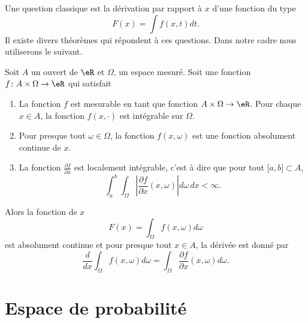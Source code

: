 Une question classique est la dérivation par rapport à \( x\) d'une fonction du type
\begin{equation}
    F(x)=\int f(x,t)dt.
\end{equation}
Il existe divers théorèmes qui répondent à ces questions. Dans notre cadre nous utiliserons le suivant.
\begin{theorem}     \label{ThoDerSousIntegrale}
    Soit \( A\) un ouvert de \( \eR\) et \( \Omega\), un espace mesuré. Soit une fonction \( f\colon A\times \Omega\to \eR\) qui satisfait
    \begin{enumerate}
        \item
            La fonction \( f\) est mesurable en tant que fonction \( A\times\Omega\to \eR\). Pour chaque \( x\in A\), la fonction \( f(x,\cdot)\) est intégrable sur \( \Omega\).
        \item
            Pour presque tout \( \omega\in\Omega\), la fonction \( f(x,\omega)\) est une fonction absolument continue de \( x\).
        \item
            La fonction \( \frac{ \partial f }{ \partial x }\) est localement intégrable, c'est à dire que pour tout \( \mathopen[ a , b \mathclose]\subset A\),
            \begin{equation}
                \int_a^b\int_{\Omega}\left| \frac{ \partial f }{ \partial x }(x,\omega) \right| d\omega\,dx<\infty.
            \end{equation}
    \end{enumerate}
    Alors la fonction de \( x\)
    \begin{equation}
        F(x)=\int_{\Omega}f(x,\omega)d\omega
    \end{equation}
    est absolument continue et pour presque tout \( x\in A\), la dérivée est donné par
    \begin{equation}
        \frac{ d }{ dx }\int_{\Omega}f(x,\omega)d\omega=\int_{\Omega}\frac{ \partial f }{ \partial x }(x,\omega)d\omega.
    \end{equation}
\end{theorem}

\section{Espace de probabilité}

